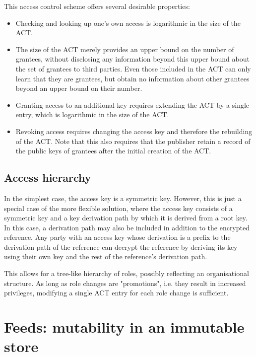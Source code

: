 This access control scheme offers several desirable properties:
\begin{itemize}
\item Checking and looking up one's own access is logarithmic in the size of the ACT.
\item The size of the ACT merely provides an upper bound on the number of grantees, without disclosing any information beyond this upper bound about the set of grantees to third parties. Even those included in the ACT can only learn that they are grantees, but obtain no information about other grantees beyond an upper bound on their number.
\item Granting access to an additional key requires extending the ACT by a single entry, which is logarithmic in the size of the ACT. 
\item Revoking access requires changing the access key and therefore the rebuilding of the ACT. Note that this also requires that the publisher retain a record of the public keys of grantees after the initial creation of the ACT.
\end{itemize}

\subsection{Access hierarchy\statusgreen}

In the simplest case, the access key is a symmetric key. However, this is just a special case of the more flexible solution, where
the access key consists of a symmetric key and a key derivation path by which it is derived from a root key. In this case, a derivation path may also be included in addition to the encrypted reference. Any party with an access key whose derivation is a prefix to the derivation path of the reference can decrypt the reference by deriving its key using their own key and the rest of the reference's derivation path.

This allows for a tree-like hierarchy of roles, possibly reflecting an organisational structure. As long as role changes are "promotions", i.e. they result in increased privileges, modifying a single ACT entry for each role change is sufficient.




\section{Feeds: mutability in an immutable store \statusyellow}\label{sec:feeds}

